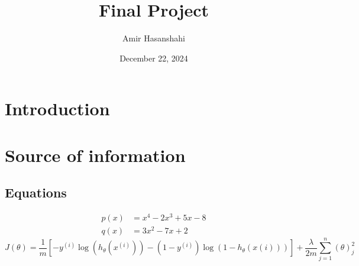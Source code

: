 \documentclass{article}
\title{Final Project}
\author{Amir Hasanshahi}
\date{December 22, 2024}
\begin{document}
	\maketitle
	\tableofcontents
	\newpage

	\section{Introduction}
	\lipsum[1-3]
	\newpage

	\section{Source of information}
	\subsection{Equations}
	\begin{align}
		p(x) & = x^{4}- 2x^{3}+ 5x - 8 \\
		q(x) & = 3x^{2}- 7x + 2
	\end{align}
	\begin{equation*}
		J(\theta) = \frac{1}{m}\left[-y^{(i)}\log(h_{\theta}(x^{(i)})) -(1 - y^{(i)})
		\log(1-h_{\theta}(x(i)))\right] + \frac{\lambda}{2m}\sum_{j = 1}^{n}(\theta )
		_{j}^{2}
	\end{equation*}
\end{document}
